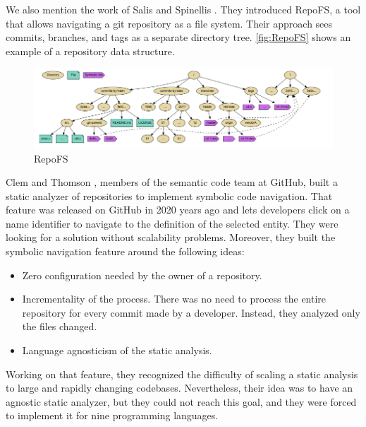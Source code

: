 We also mention the work of Salis and Spinellis \cite{Salis2019}.
They introduced RepoFS, a tool that allows navigating a git repository as a file system. 
Their approach sees commits, branches, and tags as a separate directory tree. 
\autoref{fig:RepoFS} shows an example of a repository data structure. 

\begin{figure}[H]
\centering
  \includegraphics[width=0.9\linewidth]{Salis2019.png} 
  \caption{RepoFS}
  \label{fig:RepoFS}
\end{figure}

Clem and Thomson \cite{Clem2021}, members of the semantic code team at GitHub, built a static analyzer of repositories to implement symbolic code navigation. 
That feature was released on GitHub in 2020 years ago and lets developers click on a name identifier to navigate to the definition of the selected entity. 
They were looking for a solution without scalability problems. 
Moreover, they built the symbolic navigation feature around the following ideas:
\begin{itemize}
  \item Zero configuration needed by the owner of a repository.
  \item Incrementality of the process. There was no need to process the entire repository for every commit made by a developer. Instead, they analyzed only the files changed. 
  \item Language agnosticism of the static analysis. 
\end{itemize}

Working on that feature, they recognized the difficulty of scaling a static analysis to large and rapidly changing codebases.
Nevertheless, their idea was to have an agnostic static analyzer, but they could not reach this goal, and they were forced to implement it for nine programming languages.  

